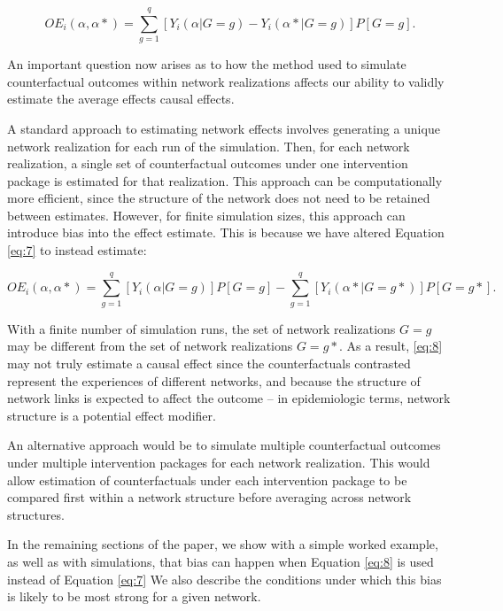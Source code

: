 \documentclass{article}
\theoremstyle{definition}
\begin{document}
\begin{equation}\label{eq:7}
   OE_{i}\left(\alpha,\alpha* \right) = \sum_{g=1}^q\left[Y_{i}\left(\alpha|G=g\right) - Y_{i}\left(\alpha*|G=g\right)\right]P\left[G=g\right].	
\end{equation}

An important question now arises as to how the method used to simulate counterfactual outcomes within network realizations affects our ability to validly estimate the average effects causal effects. 

A standard approach to estimating network effects involves generating a unique network realization for each run of the simulation. Then, for each network realization, a single set of counterfactual outcomes under one intervention package is estimated for that realization. This approach can be computationally more efficient, since the structure of the network does not need to be retained between estimates. However, for finite simulation sizes, this approach can introduce bias into the effect estimate. This is because we have altered Equation \ref{eq:7} to instead estimate:

\begin{equation}\label{eq:8}
   OE_{i}\left(\alpha,\alpha* \right) = \sum_{g=1}^q\left[Y_{i}\left(\alpha|G=g\right)\right]P\left[G=g\right]- \sum_{g=1}^q\left[Y_{i}\left(\alpha*|G=g*\right)\right]P\left[G=g*\right].	
\end{equation}

With a finite number of simulation runs, the set of network realizations $G=g$ may be different from the set of network realizations $G=g*$. As a result, \ref{eq:8} may not truly estimate a causal effect since the counterfactuals contrasted represent the experiences of different networks, and because the structure of network links is expected to affect the outcome -- in epidemiologic terms, network structure is a potential effect modifier.

An alternative approach would be to simulate multiple counterfactual outcomes under multiple intervention packages for each network realization. This would allow estimation of counterfactuals under each intervention package to be compared first within a network structure before averaging across network structures. 

In the remaining sections of the paper, we show with a simple worked example, as well as with simulations, that bias can happen when  Equation \ref{eq:8} is used instead of Equation \ref{eq:7} We also describe the conditions under which this bias is likely to be most strong for a given network.
\end{document}
